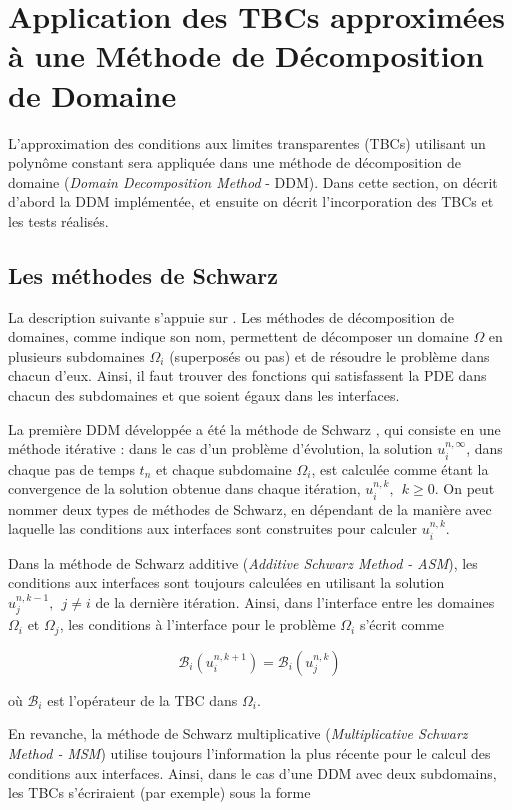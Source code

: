 \section{Application des TBCs approximées à une Méthode de Décomposition de Domaine}

\indent L'approximation des conditions aux limites transparentes (TBCs) utilisant un polynôme constant sera appliquée dans une méthode de décomposition de domaine (\emph{Domain Decomposition Method} - DDM). Dans cette section, on décrit d'abord la DDM implémentée, et ensuite on décrit l'incorporation des TBCs et les tests réalisés.

\subsection{Les méthodes de Schwarz}

\indent La description suivante s’appuie sur \cite{Japhet2003}. Les méthodes de décomposition de domaines, comme indique son nom, permettent de décomposer un domaine $\Omega$ en plusieurs subdomaines $\Omega_i$ (superposés ou pas) et de résoudre le problème dans chacun d'eux. Ainsi, il faut trouver des fonctions qui satisfassent la PDE dans chacun des subdomaines et que soient égaux dans les interfaces.

\indent La première DDM développée a été la méthode de Schwarz \cite{Japhet2003,Gander2008}, qui consiste en une méthode itérative : dans le cas d'un problème d'évolution, la solution $u_i^{n,\infty}$, dans chaque pas de temps $t_n$ et chaque subdomaine $\Omega_i$, est calculée comme étant la convergence de la solution obtenue dans chaque itération, $u_i^{n,k}, \ \ k\geq 0$. On peut nommer deux types de méthodes de Schwarz, en dépendant de la manière avec laquelle las conditions aux interfaces sont construites pour calculer $u_i^{n,k}$.

\indent Dans la méthode de Schwarz additive (\emph{Additive Schwarz Method - ASM}), les conditions aux interfaces sont toujours calculées en utilisant la solution $u_j^{n,k-1}, \ \ j \neq i$ de la dernière itération. Ainsi, dans l'interface entre les domaines $\Omega_i$ et $\Omega_j$, les conditions à l'interface pour le problème $\Omega_i$ s'écrit comme

$$\mathcal{B}_i(u_i^{n,k+1}) = \mathcal{B}_i(u_j^{n,k})$$

\noindent où $\mathcal{B}_i$ est l'opérateur de la TBC dans $\Omega_i$.

\indent En revanche, la méthode de Schwarz multiplicative (\emph{Multiplicative Schwarz Method - MSM}) utilise toujours l'information la plus récente pour le calcul des conditions aux interfaces. Ainsi, dans le cas d'une DDM avec deux subdomains, les TBCs s'écriraient (par exemple) sous la forme

